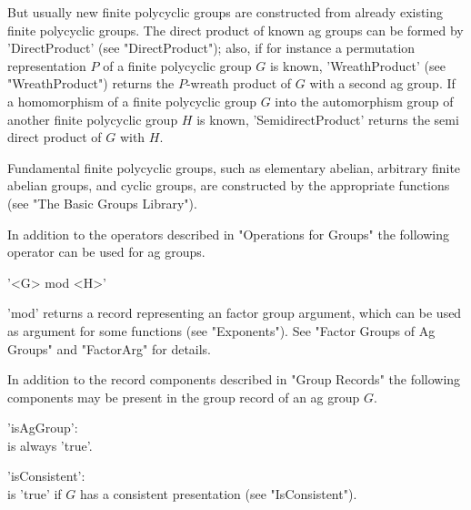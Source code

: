 But  usually new finite polycyclic  groups   are constructed from already
existing finite polycyclic groups.  The direct product of known ag groups
can  be formed  by  'DirectProduct' (see  "DirectProduct"); also, if  for
instance  a permutation representation $P$  of a finite polycyclic  group
$G$   is known,  'WreathProduct'  (see   "WreathProduct")   returns   the
$P$-wreath product of $G$ with a second ag group.  If a homomorphism of a
finite polycyclic group $G$ into the automorphism group of another finite
polycyclic group  $H$  is  known, 'SemidirectProduct'  returns   the semi
direct product of $G$ with $H$.

Fundamental  finite   polycyclic  groups,  such  as  elementary  abelian,
arbitrary finite  abelian groups, and cyclic  groups, are constructed  by
the appropriate functions (see "The Basic Groups Library").



In addition  to  the operators described in  "Operations for  Groups" the
following operator can be used for ag groups.

'<G> mod <H>'

'mod' returns a record representing  an  factor group argument, which can
be used  as argument for some functions  (see  "Exponents").  See "Factor
Groups of Ag Groups" and "FactorArg" for details.


In addition  to the record components  described in  "Group  Records" the
following components may be present  in the group record of  an ag  group
$G$.

'isAgGroup': \\
        is always 'true'.

'isConsistent': \\
        is  'true'   if   $G$   has   a   consistent    presentation (see
        "IsConsistent").

